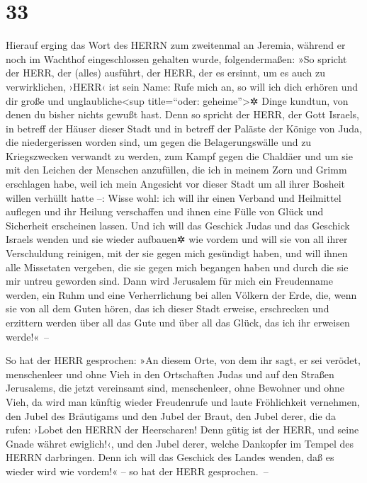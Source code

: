 \hypertarget{section-32}{%
\section{33}\label{section-32}}

Hierauf erging das Wort des HERRN zum zweitenmal an
Jeremia, während er noch im Wachthof eingeschlossen gehalten wurde,
folgendermaßen: »So spricht der HERR, der (alles)
ausführt, der HERR, der es ersinnt, um es auch zu verwirklichen, ›HERR‹
ist sein Name: Rufe mich an, so will ich dich erhören und
dir große und unglaubliche\textless sup title=``oder:
geheime''\textgreater✲ Dinge kundtun, von denen du bisher nichts gewußt
hast. Denn so spricht der HERR, der Gott Israels, in
betreff der Häuser dieser Stadt und in betreff der Paläste der Könige
von Juda, die niedergerissen worden sind, um gegen die Belagerungswälle
und zu Kriegszwecken verwandt zu werden, zum Kampf gegen
die Chaldäer und um sie mit den Leichen der Menschen anzufüllen, die ich
in meinem Zorn und Grimm erschlagen habe, weil ich mein Angesicht vor
dieser Stadt um all ihrer Bosheit willen verhüllt hatte --:
Wisse wohl: ich will ihr einen Verband und Heilmittel
auflegen und ihr Heilung verschaffen und ihnen eine Fülle von Glück und
Sicherheit erscheinen lassen. Und ich will das Geschick
Judas und das Geschick Israels wenden und sie wieder aufbauen✲ wie
vordem und will sie von all ihrer Verschuldung reinigen,
mit der sie gegen mich gesündigt haben, und will ihnen alle Missetaten
vergeben, die sie gegen mich begangen haben und durch die sie mir untreu
geworden sind. Dann wird Jerusalem für mich ein
Freudenname werden, ein Ruhm und eine Verherrlichung bei allen Völkern
der Erde, die, wenn sie von all dem Guten hören, das ich dieser Stadt
erweise, erschrecken und erzittern werden über all das Gute und über all
das Glück, das ich ihr erweisen werde!«~--

So hat der HERR gesprochen: »An diesem Orte, von dem ihr
sagt, er sei verödet, menschenleer und ohne Vieh in den Ortschaften
Judas und auf den Straßen Jerusalems, die jetzt vereinsamt sind,
menschenleer, ohne Bewohner und ohne Vieh, da wird man
künftig wieder Freudenrufe und laute Fröhlichkeit vernehmen, den Jubel
des Bräutigams und den Jubel der Braut, den Jubel derer, die da rufen:
›Lobet den HERRN der Heerscharen! Denn gütig ist der HERR, und seine
Gnade währet ewiglich!‹, und den Jubel derer, welche Dankopfer im Tempel
des HERRN darbringen. Denn ich will das Geschick des Landes wenden, daß
es wieder wird wie vordem!« -- so hat der HERR gesprochen.~--


